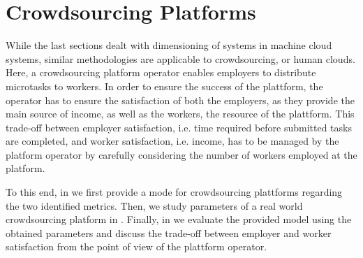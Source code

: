 \section{Crowdsourcing Platforms}\label{sec:cloud:crowdsourcing}
\newcommand{\campaignIAT}{\ensuremath{t_c}\xspace}
\newcommand{\campaignSize}{\ensuremath{\Theta}\xspace}
\newcommand{\taskDuration}{\ensuremath{B}\xspace}
\newcommand{\meanTaskLength}{\ensuremath{E[B]}\xspace}
\newcommand{\numberOfWorkers}{\ensuremath{c}\xspace}
\newcommand{\workerUtilization}{\ensuremath{\rho}\xspace}
\newcommand{\campaignDuration}{\ensuremath{\delta}\xspace}
\newcommand{\preTaskProcessingDelay}{\ensuremath{E[D]}\xspace}
While the last sections dealt with dimensioning of systems in machine cloud systems, similar methodologies are applicable to crowdsourcing, or human clouds.
Here, a crowdsourcing platform operator enables employers to distribute microtasks to workers.
In order to ensure the success of the plattform, the operator has to ensure the satisfaction of both the employers, as they provide the main source of income, as well as the workers, the resource of the plattform.
This trade-off between employer satisfaction, i.e. time required before submitted tasks are completed, and worker satisfaction, i.e. income, has to be managed by the platform operator by carefully considering the number of workers employed at the platform.

To this end, in  we first provide a mode for crowdsourcing plattforms regarding the two identified metrics.
Then, we study parameters of a real world crowdsourcing platform in .
Finally, in  we evaluate the provided model using the obtained parameters and discuss the trade-off between employer and worker satisfaction from the point of view of the plattform operator.




